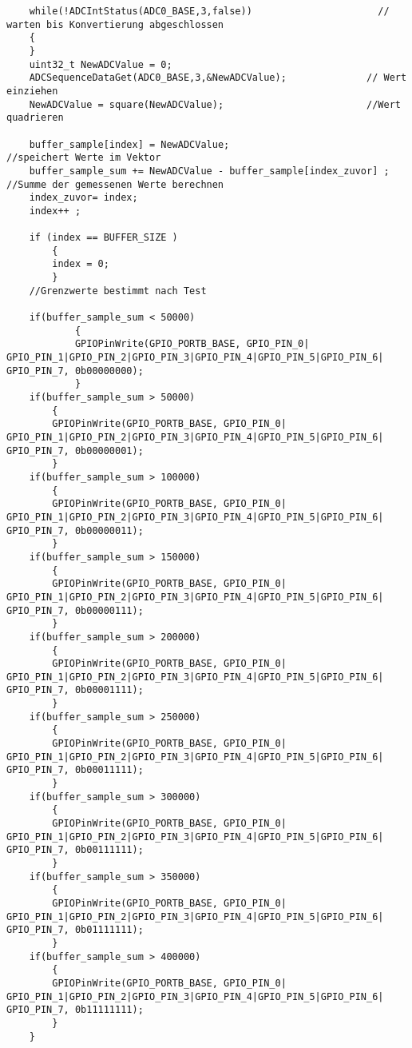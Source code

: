 \begin{lstlisting}
    while(!ADCIntStatus(ADC0_BASE,3,false))                      // warten bis Konvertierung abgeschlossen
    {
    }
    uint32_t NewADCValue = 0;
    ADCSequenceDataGet(ADC0_BASE,3,&NewADCValue);              // Wert einziehen
    NewADCValue = square(NewADCValue);                         //Wert quadrieren

    buffer_sample[index] = NewADCValue;                                 //speichert Werte im Vektor
    buffer_sample_sum += NewADCValue - buffer_sample[index_zuvor] ;     //Summe der gemessenen Werte berechnen
    index_zuvor= index;
    index++ ;

    if (index == BUFFER_SIZE )
        {
        index = 0;
        }
    //Grenzwerte bestimmt nach Test

    if(buffer_sample_sum < 50000)
            {
            GPIOPinWrite(GPIO_PORTB_BASE, GPIO_PIN_0| GPIO_PIN_1|GPIO_PIN_2|GPIO_PIN_3|GPIO_PIN_4|GPIO_PIN_5|GPIO_PIN_6| GPIO_PIN_7, 0b00000000);
            }
    if(buffer_sample_sum > 50000)
        {
        GPIOPinWrite(GPIO_PORTB_BASE, GPIO_PIN_0| GPIO_PIN_1|GPIO_PIN_2|GPIO_PIN_3|GPIO_PIN_4|GPIO_PIN_5|GPIO_PIN_6| GPIO_PIN_7, 0b00000001);
        }
    if(buffer_sample_sum > 100000)
        {
        GPIOPinWrite(GPIO_PORTB_BASE, GPIO_PIN_0| GPIO_PIN_1|GPIO_PIN_2|GPIO_PIN_3|GPIO_PIN_4|GPIO_PIN_5|GPIO_PIN_6| GPIO_PIN_7, 0b00000011);
        }
    if(buffer_sample_sum > 150000)
        {
        GPIOPinWrite(GPIO_PORTB_BASE, GPIO_PIN_0| GPIO_PIN_1|GPIO_PIN_2|GPIO_PIN_3|GPIO_PIN_4|GPIO_PIN_5|GPIO_PIN_6| GPIO_PIN_7, 0b00000111);
        }
    if(buffer_sample_sum > 200000)
        {
        GPIOPinWrite(GPIO_PORTB_BASE, GPIO_PIN_0| GPIO_PIN_1|GPIO_PIN_2|GPIO_PIN_3|GPIO_PIN_4|GPIO_PIN_5|GPIO_PIN_6| GPIO_PIN_7, 0b00001111);
        }
    if(buffer_sample_sum > 250000)
        {
        GPIOPinWrite(GPIO_PORTB_BASE, GPIO_PIN_0| GPIO_PIN_1|GPIO_PIN_2|GPIO_PIN_3|GPIO_PIN_4|GPIO_PIN_5|GPIO_PIN_6| GPIO_PIN_7, 0b00011111);
        }
    if(buffer_sample_sum > 300000)
        {
        GPIOPinWrite(GPIO_PORTB_BASE, GPIO_PIN_0| GPIO_PIN_1|GPIO_PIN_2|GPIO_PIN_3|GPIO_PIN_4|GPIO_PIN_5|GPIO_PIN_6| GPIO_PIN_7, 0b00111111);
        }
    if(buffer_sample_sum > 350000)
        {
        GPIOPinWrite(GPIO_PORTB_BASE, GPIO_PIN_0| GPIO_PIN_1|GPIO_PIN_2|GPIO_PIN_3|GPIO_PIN_4|GPIO_PIN_5|GPIO_PIN_6| GPIO_PIN_7, 0b01111111);
        }
    if(buffer_sample_sum > 400000)
        {
        GPIOPinWrite(GPIO_PORTB_BASE, GPIO_PIN_0| GPIO_PIN_1|GPIO_PIN_2|GPIO_PIN_3|GPIO_PIN_4|GPIO_PIN_5|GPIO_PIN_6| GPIO_PIN_7, 0b11111111);
        }
    }
\end{lstlisting}


